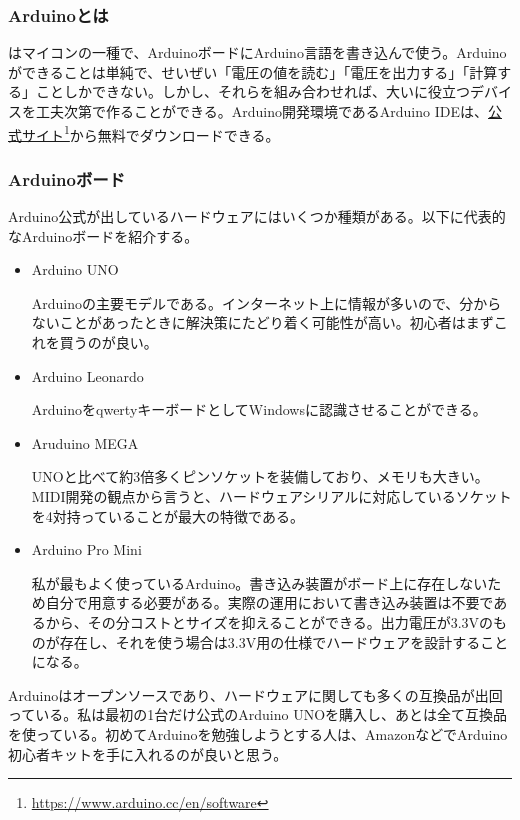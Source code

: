 \documentclass[uplatex, 10pt, dvipdfmx]{jsarticle}
\numberwithin{equation}{section}
\newcommand{\emphj}[1]{\textbf{\textrm{\textgt{{#1}}}}}
\begin{document}
\subsubsection{Arduinoとは}
\emphj{Arduino}はマイコンの一種で、ArduinoボードにArduino言語を書き込んで使う。Arduinoができることは単純で、せいぜい「電圧の値を読む」「電圧を出力する」「計算する」ことしかできない。しかし、それらを組み合わせれば、大いに役立つデバイスを工夫次第で作ることができる。Arduino開発環境であるArduino IDEは、\href{https://www.arduino.cc/en/software}{公式サイト}\footnote{\url{https://www.arduino.cc/en/software}}から無料でダウンロードできる。

\subsubsection{Arduinoボード}
Arduino公式が出しているハードウェアにはいくつか種類がある。以下に代表的なArduinoボードを紹介する。
\begin{itemize}
\item Arduino UNO

Arduinoの主要モデルである。インターネット上に情報が多いので、分からないことがあったときに解決策にたどり着く可能性が高い。初心者はまずこれを買うのが良い。

\item Arduino Leonardo

ArduinoをqwertyキーボードとしてWindowsに認識させることができる\cite{EMA}。

\item Aruduino MEGA

UNOと比べて約3倍多くピンソケットを装備しており、メモリも大きい。MIDI開発の観点から言うと、ハードウェアシリアルに対応しているソケットを4対持っていることが最大の特徴である。

\item Arduino Pro Mini

私が最もよく使っているArduino。書き込み装置がボード上に存在しないため自分で用意する必要がある。実際の運用において書き込み装置は不要であるから、その分コストとサイズを抑えることができる。出力電圧が3.3Vのものが存在し、それを使う場合は3.3V用の仕様\cite{3.3V}でハードウェアを設計することになる。

\end{itemize}

Arduinoはオープンソースであり、ハードウェアに関しても多くの互換品が出回っている。私は最初の1台だけ公式のArduino UNOを購入し、あとは全て互換品を使っている。初めてArduinoを勉強しようとする人は、AmazonなどでArduino初心者キットを手に入れるのが良いと思う。
\end{document}

